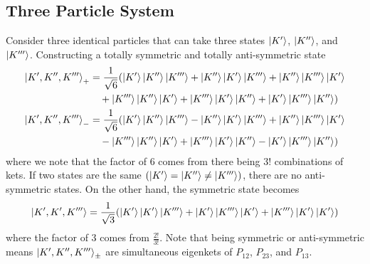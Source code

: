 \documentclass[12pt,a4paper,titlepage]{article}
\newcommand{\ul}[1]{\underline{\smash{#1}}} %
\begin{document}
\subsection{Three Particle System}
Consider three identical particles that can take three states $\ket{K^{\prime}}$, $\ket{K^{\prime\prime}}$, and $\ket{K^{\prime\prime\prime}}$. Constructing a totally symmetric and totally anti-symmetric state
\begin{equation}
\begin{aligned}
\ket{K^{\prime},K^{\prime\prime},K^{\prime\prime\prime}}_{+}&=\frac{1}{\sqrt{6}}(\ket{K^{\prime}}\ket{K^{\prime\prime}}\ket{K^{\prime\prime\prime}}+\ket{K^{\prime\prime}}\ket{K^{\prime}}\ket{K^{\prime\prime\prime}}+\ket{K^{\prime\prime}}\ket{K^{\prime\prime\prime}}\ket{K^{\prime}}\\
&\quad+\ket{K^{\prime\prime\prime}}\ket{K^{\prime\prime}}\ket{K^{\prime}}+\ket{K^{\prime\prime\prime}}\ket{K^{\prime}}\ket{K^{\prime\prime}}+\ket{K^{\prime}}\ket{K^{\prime\prime\prime}}\ket{K^{\prime\prime}})\\
\ket{K^{\prime},K^{\prime\prime},K^{\prime\prime\prime}}_{-}&=\frac{1}{\sqrt{6}}(\ket{K^{\prime}}\ket{K^{\prime\prime}}\ket{K^{\prime\prime\prime}}-\ket{K^{\prime\prime}}\ket{K^{\prime}}\ket{K^{\prime\prime\prime}}+\ket{K^{\prime\prime}}\ket{K^{\prime\prime\prime}}\ket{K^{\prime}}\\
&\quad-\ket{K^{\prime\prime\prime}}\ket{K^{\prime\prime}}\ket{K^{\prime}}+\ket{K^{\prime\prime\prime}}\ket{K^{\prime}}\ket{K^{\prime\prime}}-\ket{K^{\prime}}\ket{K^{\prime\prime\prime}}\ket{K^{\prime\prime}})
\end{aligned}
\end{equation}
where we note that the factor of 6 comes from there being $3!$ combinations of kets. If two states are the same $(\ket{K^{\prime}}=\ket{K^{\prime\prime}}\neq\ket{K^{\prime\prime\prime}})$, there are no anti-symmetric states. On the other hand, the symmetric state becomes
\begin{equation}
\ket{K^{\prime},K^{\prime},K^{\prime\prime\prime}}=\frac{1}{\sqrt{3}}\qty(\ket{K^{\prime}}\ket{K^{\prime}}\ket{K^{\prime\prime\prime}}+\ket{K^{\prime}}\ket{K^{\prime\prime\prime}}\ket{K^{\prime}}+\ket{K^{\prime\prime\prime}}\ket{K^{\prime}}\ket{K^{\prime}})
\end{equation}
where the factor of 3 comes from $\frac{2!}{3!}$. Note that being \ul{totally} symmetric or anti-symmetric means $\ket{K^{\prime},K^{\prime\prime},K^{\prime\prime\prime}}_{\pm}$ are simultaneous eigenkets of $P_{12}$, $P_{23}$, and $P_{13}$.\\
\end{document}
